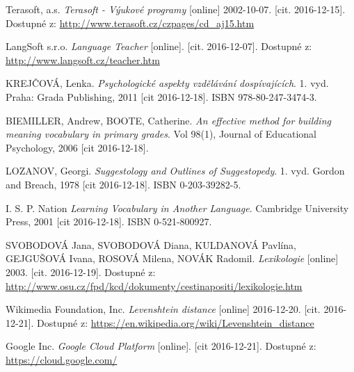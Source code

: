 \documentclass[a4paper,11pt,titlepage,fleqn]{article}
\begin{document}
\newpage
\begin{thebibliography}{99}
    

        Terasoft, a.s. \textit{Terasoft - Výukové programy} [online] 2002-10-07. [cit. 2016-12-15]. Dostupné z: \url{http://www.terasoft.cz/czpages/cd_aj15.htm}
    
        LangSoft s.r.o. \textit{Language Teacher} [online]. [cit. 2016-12-07]. Dostupné z: \url{http://www.langsoft.cz/teacher.htm}

        KREJČOVÁ, Lenka. \textit{Psychologické aspekty vzdělávání dospívajících}. 1. vyd. Praha: Grada Publishing, 2011 [cit 2016-12-18]. ISBN 978-80-247-3474-3.

        BIEMILLER, Andrew, BOOTE, Catherine. \textit{An effective method for building meaning vocabulary in primary grades}. Vol 98(1), Journal of Educational Psychology, 2006 [cit 2016-12-18].

        LOZANOV, Georgi. \textit{Suggestology and Outlines of Suggestopedy}. 1. vyd. Gordon and Breach, 1978 [cit 2016-12-18]. ISBN 0-203-39282-5.

        I. S. P. Nation \textit{Learning Vocabulary in Another Language}. Cambridge University Press, 2001 [cit 2016-12-18]. ISBN 0-521-800927.

        SVOBODOVÁ Jana, SVOBODOVÁ Diana, KULDANOVÁ Pavlína, GEJGUŠOVÁ Ivana, ROSOVÁ Milena, NOVÁK Radomil. \textit{Lexikologie} [online] 2003. [cit. 2016-12-19]. Dostupné z: \url{http://www.osu.cz/fpd/kcd/dokumenty/cestinapositi/lexikologie.htm}

         Wikimedia Foundation, Inc. \textit{Levenshtein distance} [online] 2016-12-20. [cit. 2016-12-21]. Dostupné z: \url{https://en.wikipedia.org/wiki/Levenshtein_distance}
        
        Google Inc. \textit{Google Cloud Platform} [online]. [cit 2016-12-21]. Dostupné z: \url{https://cloud.google.com/}
 
\end{thebibliography}
\end{document}
